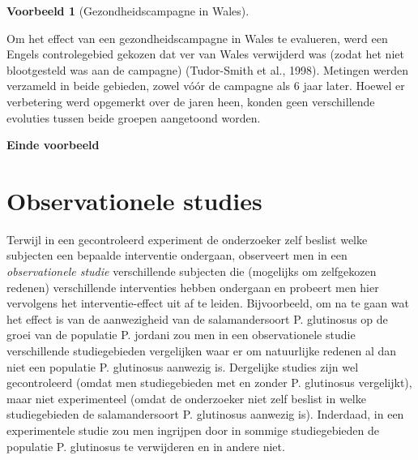 \documentclass[
  12pt,dutch]{book}
\theoremstyle{definition}
\theoremstyle{definition}
\newtheorem{example}{Voorbeeld}[chapter]
\theoremstyle{definition}
\theoremstyle{definition}
\theoremstyle{remark}
\begin{document}
\begin{example}[Gezondheidscampagne in Wales]
\protect\hypertarget{exm:unnamed-chunk-81}{}\label{exm:unnamed-chunk-81}~
\end{example}

Om het effect van een gezondheidscampagne in Wales te evalueren, werd
een Engels controlegebied gekozen dat ver van Wales verwijderd was (zodat
het niet blootgesteld was aan de campagne) (Tudor-Smith et al., 1998).
Metingen werden verzameld in beide gebieden, zowel vóór de campagne
als 6 jaar later. Hoewel er verbetering werd opgemerkt over de jaren heen,
konden geen verschillende evoluties tussen beide groepen aangetoond worden.

\textbf{Einde voorbeeld}

\section{Observationele studies}\label{sec:observational}

Terwijl in een gecontroleerd experiment de onderzoeker zelf beslist
welke subjecten een bepaalde interventie ondergaan, observeert men
in een \emph{observationele studie} verschillende subjecten die (mogelijks om zelfgekozen redenen) verschillende interventies hebben ondergaan en probeert men hier vervolgens het interventie-effect uit af te leiden. Bijvoorbeeld, om na te gaan wat het effect is van de aanwezigheid van de salamandersoort P. glutinosus op de groei van de populatie P. jordani zou men in een observationele studie verschillende studiegebieden vergelijken waar er om natuurlijke redenen al dan niet een populatie P. glutinosus aanwezig is. Dergelijke studies
zijn wel gecontroleerd (omdat men studiegebieden met en zonder P. glutinosus vergelijkt), maar niet experimenteel (omdat de
onderzoeker niet zelf beslist in welke studiegebieden de salamandersoort P. glutinosus aanwezig is). Inderdaad, in een experimentele studie zou men ingrijpen door in sommige studiegebieden de populatie P. glutinosus te verwijderen en in andere niet.
\end{document}
